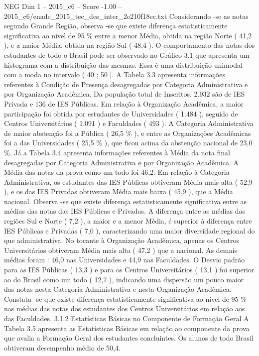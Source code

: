 \begin{textsample}{NEG Dim 1 – 2015\_c6 – Score -1.00 – 2015\_c6/enade\_2015\_tec\_des\_inter\_2e210f18ec.txt}
Considerando -se as notas segundo Grande Região, observa -se que existe diferença estatisticamente significativa ao nível de 95 \% entre a menor Média, obtida na região Norte ( 41,2 ), e a maior Média, obtida na região Sul ( 48,4 ).
O comportamento das notas dos estudantes de todo o Brasil pode ser observado no Gráfico 3.1 que apresenta um histograma com a distribuição das mesmas.
Essa é uma distribuição unimodal com a moda no intervalo ( 40 ; 50 ].
A Tabela 3.3 apresenta informações referentes à Condição de Presença desagregadas por Categoria Administrativa e por Organização Acadêmica.
Da população total de Inscritos, 2.932 são de IES Privada e 136 de IES Públicas.
Em relação à Organização Acadêmica, a maior participação foi obtida por estudantes de Universidades ( 1.484 ), seguido de Centros Universitários ( 1.091 ) e Faculdades ( 493 ).
A Categoria Administrativa de maior abstenção foi a Pública ( 26,5 \% ), e entre as Organizações Acadêmicas foi a das Universidades ( 25,5 \% ), que ficou acima da abstenção nacional de 23,0 \%.
Já a Tabela 3.4 apresenta informações referentes à Média da nota final desagregadas por Categoria Administrativa e por Organização Acadêmica.
A Média das notas da prova como um todo foi 46,2.
Em relação à Categoria Administrativa, os estudantes das IES Públicas obtiveram Média mais alta ( 52,9 ), e os das IES Privadas obtiveram Média mais baixa ( 45,9 ), que a Média nacional.
Observa -se que existe diferença estatisticamente significativa entre as médias das notas das IES Públicas e Privadas.
A diferença entre as médias das regiões Sul e Norte ( 7,2 ), a maior e a menor Média, é superior à diferença entre IES Públicas e Privadas ( 7,0 ), caracterizando uma maior diversidade regional do que administrativa.
No tocante à Organização Acadêmica, apenas os Centros Universitários obtiveram Média mais alta ( 47,2 ) que a nacional.
As demais médias foram : 46,0 nas Universidades e 44,9 nas Faculdades.
O Desvio padrão para as IES Públicas ( 13,3 ) e para os Centros Universitários ( 13,1 ) foi superior ao do Brasil como um todo ( 12,7 ), indicando uma dispersão um pouco maior das notas nesta Categoria Administrativa e nesta Organização Acadêmica.
Constata -se que existe diferença estatisticamente significativa ao nível de 95 \% nas médias das notas dos estudantes dos Centros Universitários em relação aos das Faculdades. 3.1.2 Estatísticas Básicas no Componente de Formação Geral A Tabela 3.5 apresenta as Estatísticas Básicas em relação ao componente da prova que avalia a Formação Geral dos estudantes concluintes.
Os alunos de todo Brasil obtiveram desempenho médio de 50,4.

\end{textsample}
